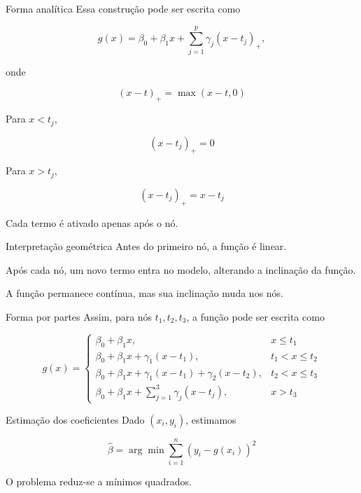 \documentclass[
  ignorenonframetext,
  aspectratio=169,
]{beamer}
\begin{document}
\begin{frame}
\begin{block}{Forma analítica}
\label{forma-analuxedtica}
Essa construção pode ser escrita como

\[
g(x) = \beta_0 + \beta_1 x + \sum_{j=1}^{p} \gamma_j (x - t_j)_+,
\]

onde

\[
(x - t)_+ = \max(x - t, 0)
\]
\end{block}
\end{frame}

\begin{frame}
Para \(x < t_j\),

\[
(x - t_j)_+ = 0
\]

Para \(x > t_j\),

\[
(x - t_j)_+ = x - t_j
\]

Cada termo é ativado apenas após o nó.
\end{frame}

\begin{frame}
\begin{block}{Interpretação geométrica}
\label{interpretauxe7uxe3o-geomuxe9trica}
Antes do primeiro nó, a função é linear.

Após cada nó, um novo termo entra no modelo, alterando a inclinação da
função.

A função permanece contínua, mas sua inclinação muda nos nós.
\end{block}
\end{frame}

\begin{frame}
\begin{block}{Forma por partes}
\label{forma-por-partes}
Assim, para nós \(t_1, t_2, t_3\), a função pode ser escrita como

\[
g(x) =
\begin{cases}
\beta_0 + \beta_1 x, & x \le t_1 \\
\beta_0 + \beta_1 x + \gamma_1(x - t_1), & t_1 < x \le t_2 \\
\beta_0 + \beta_1 x + \gamma_1(x - t_1) + \gamma_2(x - t_2), & t_2 < x \le t_3 \\
\beta_0 + \beta_1 x + \sum_{j=1}^3 \gamma_j(x - t_j), & x > t_3
\end{cases}
\]
\end{block}
\end{frame}

\begin{frame}
\begin{block}{Estimação dos coeficientes}
\label{estimauxe7uxe3o-dos-coeficientes}
Dado \((x_i,y_i)\), estimamos

\[
\hat{\beta} = \arg\min \sum_{i=1}^n (y_i - g(x_i))^2
\]

O problema reduz-se a mínimos quadrados.
\end{block}
\end{frame}
\end{document}

